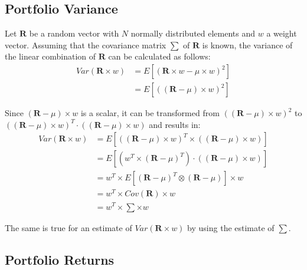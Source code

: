 \documentclass[
  oneside]{book}
\begin{document}
\hypertarget{portvar}{%
\subsection{Portfolio Variance}\label{portvar}}

Let \(\pmb{R}\) be a random vector with \(N\) normally distributed elements and \(w\) a weight vector. Assuming that the covariance matrix \(\sum\) of \(\pmb{R}\) is known, the variance of the linear combination of \(\pmb{R}\) can be calculated as follows:
\begin{align*}
  Var(\pmb{R} \times w) &= E[(\pmb{R} \times w - \mu \times w)^2] \\
  &= E[((\pmb{R} - \mu) \times w)^2]
\end{align*}

Since \((\pmb{R} - \mu) \times w\) is a scalar, it can be transformed from \(((\pmb{R} - \mu) \times w)^2\) to \(((\pmb{R} - \mu) \times w)^T \cdot ((\pmb{R} - \mu) \times w)\) and results in:
\begin{align*}
  Var(\pmb{R} \times w) &= E[((\pmb{R} - \mu) \times w)^T \times ((\pmb{R} - \mu) \times w)]\\ 
  &= E[(w^T \times (\pmb{R} - \mu)^T) \cdot ((\pmb{R} - \mu) \times w)]\\ 
  &= w^T \times E[(\pmb{R} - \mu)^T \otimes (\pmb{R} - \mu)] \times w \\
  &= w^T \times Cov(\pmb{R}) \times w \\
  &= w^T \times \textstyle\sum \times w
\end{align*}

The same is true for an estimate of \(Var(\pmb{R} \times w)\) by using the estimate of \(\textstyle\sum\).

\hypertarget{portfolioreturns}{%
\subsection{Portfolio Returns}\label{portfolioreturns}}
\end{document}
